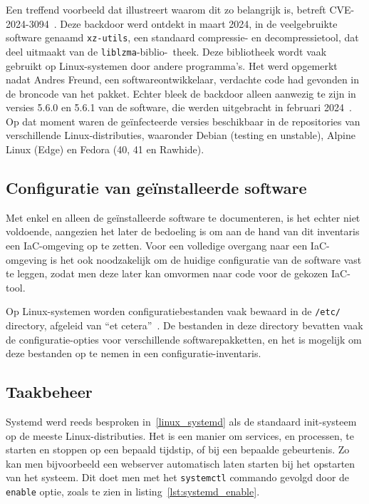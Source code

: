Een treffend voorbeeld dat illustreert waarom dit zo belangrijk is, betreft CVE-2024-3094~\autocite{nist-CVE-2024-3094}.
Deze backdoor werd ontdekt in maart 2024, in de veelgebruikte software genaamd \texttt{xz-utils}, een standaard compressie- en decompressietool, dat deel uitmaakt van de \texttt{liblzma}-biblio-\ theek.
Deze bibliotheek wordt vaak gebruikt op Linux-systemen door andere programma's.
Het werd opgemerkt nadat Andres Freund, een softwareontwikkelaar, verdachte code had gevonden in de broncode van het pakket.
Echter bleek de backdoor alleen aanwezig te zijn in versies 5.6.0 en 5.6.1 van de software, die werden uitgebracht in februari 2024~\autocite{lins2024critical}.
Op dat moment waren de ge\"infecteerde versies beschikbaar in de repositories van verschillende Linux-distributies, waaronder Debian (testing en unstable), Alpine Linux (Edge) en Fedora (40, 41 en Rawhide).

\subsection{Configuratie van ge{\"i}nstalleerde software}
\label{risico_software_configuratie}

Met enkel en alleen de ge\"installeerde software te documenteren, is het echter niet voldoende, aangezien het later de bedoeling is om aan de hand van dit inventaris een IaC-omgeving op te zetten.
Voor een volledige overgang naar een IaC-omgeving is het ook noodzakelijk om de huidige configuratie van de software vast te leggen, zodat men deze later kan omvormen naar code voor de gekozen IaC-tool.

Op Linux-systemen worden configuratiebestanden vaak bewaard in de \texttt{/etc/} directory, afgeleid van ``et cetera''~\autocite{linuxfoundation-filesystem}.
De bestanden in deze directory bevatten vaak de configuratie-opties voor verschillende softwarepakketten, en het is mogelijk om deze bestanden op te nemen in een configuratie-inventaris.

\subsection{Taakbeheer}
\label{risico_taakbeheer}

Systemd werd reeds besproken in~\ref{linux_systemd} als de standaard init-systeem op de meeste Linux-distributies.
Het is een manier om services, en processen, te starten en stoppen op een bepaald tijdstip, of bij een bepaalde gebeurtenis.
Zo kan men bijvoorbeeld een webserver automatisch laten starten bij het opstarten van het systeem.
Dit doet men met het \texttt{systemctl} commando gevolgd door de \texttt{enable} optie, zoals te zien in listing~\ref{lst:systemd_enable}.

